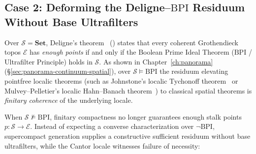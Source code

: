 \documentclass[10pt,twoside,openright]{book}
\theoremstyle{crmplain}
\theoremstyle{crmdef}
\theoremstyle{crmremark}
\begin{document}
\subsection{\texorpdfstring{Case 2: Deforming the Deligne--$\mathrm{BPI}$ Residuum Without Base Ultrafilters}{Case 2: Deforming the Deligne--BPI Residuum Without Base Ultrafilters}}

Over $\mathcal{S} = \mathbf{Set}$, Deligne's theorem~\cite[Exp.~VI, Appendice]{Deligne72} (\cite[\S D3.3, Thm.~D3.3.13]{Johnstone02}) states that every coherent Grothendieck topos $\mathcal{E}$ has \emph{enough points} if and only if the Boolean Prime Ideal Theorem ($\mathrm{BPI}$ / Ultrafilter Principle) holds in $\mathcal{S}$. As shown in Chapter~\ref{ch:panorama} (\S\ref{sec:panorama-continuum-spatial}), over $\mathcal{S} \models \mathrm{BPI}$ the residuum elevating pointfree localic theorems (such as Johnstone's localic Tychonoff theorem~\cite{Johnstone81} or Mulvey--Pelletier's localic Hahn--Banach theorem~\cite{MulveyPelletier91}) to classical spatial theorems is \emph{finitary coherence} of the underlying locale.

When $\mathcal{S} \not\models \mathrm{BPI}$, finitary compactness no longer guarantees enough stalk points $p: \mathcal{S} \to \mathcal{E}$. Instead of expecting a converse characterization over $\neg\mathrm{BPI}$, supercompact generation supplies a constructive sufficient residuum without base ultrafilters, while the Cantor locale witnesses failure of necessity:
\end{document}
